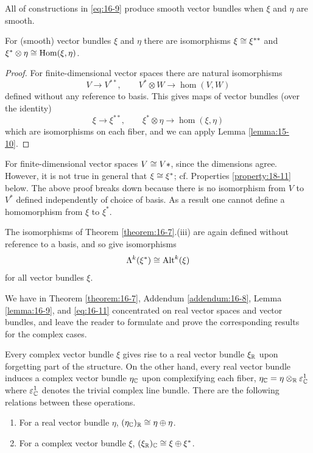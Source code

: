 All of constructions in \eqref{eq:16-9} produce smooth vector bundles when $\xi$ and $\eta$ are smooth.

\begin{lemma}\label{lemma:16-9}
  For (smooth) vector bundles $\xi$ and $\eta$ there are isomorphisms $\xi\simee \xi^{**}$ and $\xi^*\otimes \eta\simee\hom(\xi, \eta)$.
\end{lemma}

\begin{proof}
  For finite-dimensional vector spaces there are natural isomorphisms 
  \[
    V\to V^{**}, \qquad V^*\otimes W\to\hom(V, W)
  \]
  defined without any reference to basis. This gives maps of vector bundles (over the identity)
  \[
    \xi\to \xi^{**}, \qquad \xi^*\otimes\eta\to\hom(\xi, \eta)
  \]
  which are isomorphisms on each fiber, and we can apply Lemma \ref{lemma:15-10}.
\end{proof}

For finite-dimensional vector spaces $V\simee V*$, since the dimensions agree. However, 
it is not true in general that $\xi\simee\xi^*$; cf. Properties \ref{property:18-11} below. The above
proof breaks down because there is no isomorphism from $V$ to $V^*$ defined independently of choice of basis. 
As a result one cannot define a homomorphism from $\xi$ to $\xi^*$.

The isomorphisms of Theorem \ref{theorem:16-7}.(iii) are again defined without reference to a
basis, and so give isomorphisms
\begin{align}\label{eq:16-11}
  \Lambda^k(\xi^*)\simee \alt^k(\xi)
\end{align}
for all vector bundles $\xi$.

We have in Theorem \ref{theorem:16-7}, Addendum \ref{addendum:16-8}, Lemma \ref{lemma:16-9}, and \eqref{eq:16-11} 
concentrated on real vector spaces and vector bundles, and leave the reader to formulate and
prove the corresponding results for the complex cases.


Every complex vector bundle $\xi$ gives rise to a real vector bundle $\xi_\RR$ upon forgetting
part of the structure. On the other hand, every real vector bundle induces a
complex vector bundle $\eta_\CC$ upon complexifying each fiber, $\eta_\CC=\eta\otr[\RR] \varepsilon_\CC^1$ 
where $\varepsilon_\CC^1$ denotes the trivial complex line bundle. There are the following relations
between these operations.

\begin{lemma}\label{lemma:16-10}
  \begin{enumerate}
    \item For a real vector bundle $\eta$, $(\eta_\CC)_\RR\simee \eta\oplus\eta$.
    \item For a complex vector bundle $\xi$, $(\xi_\RR)_\CC\simee \xi\oplus\xi^*$.
  \end{enumerate}
\end{lemma}


